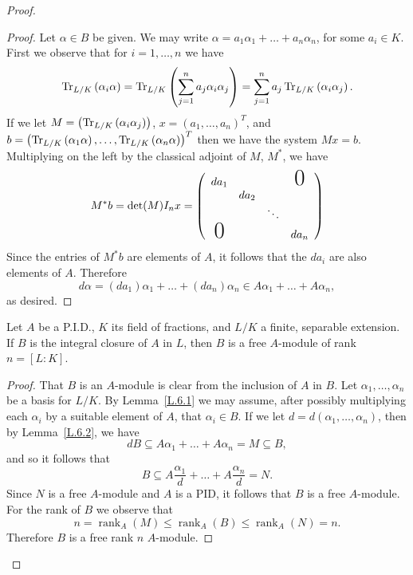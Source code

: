 \documentclass[10pt]{amsart}
\begin{document}
\begin{thm}
\begin{proof}
\begin{lem}
			\begin{proof}
				Let $\alpha \in B$ be given.
				We may write $\alpha = a_1\alpha_1 + \ldots + a_n\alpha_n$, for some $a_i \in K$.
				First we observe that for $i = 1, \ldots, n$ we have
				$$\operatorname{Tr}_{L/K}\left(\alpha_i\alpha\right) = \operatorname{Tr}_{L/K}\left(\sum_{j=1}^n a_j\alpha_i\alpha_j\right) = \sum_{j=1}^na_j\operatorname{Tr}_{L/K}\left(\alpha_i\alpha_j\right).$$
				If we let $M = \left(\operatorname{Tr}_{L/K}\left(\alpha_i\alpha_j\right)\right)$, 
				$x = (a_1, \ldots, a_n)^T$, and 
				$b = \left(\operatorname{Tr}_{L/K}\left(\alpha_1\alpha\right), \ldots, \operatorname{Tr}_{L/K}\left(\alpha_n\alpha\right)\right)^T$ 
				then we have the system $Mx = b$.
				Multiplying on the left by the classical adjoint of $M$, $M^*$, we have
				$$M^*b = \det(M)I_nx = \left(\begin{array}{cccc}
							     	da_1 & & & \text{\huge0}\\
								& da_2 & \\
   								&  & \ddots\\
    								\text{\huge0} & & & da_n
							     \end{array}\right)$$
				Since the entries of $M^*b$ are elements of $A$, it follows that the $da_i$ are also elements of $A$.
				Therefore $$d\alpha = (da_1)\alpha_1 + \ldots + (da_n)\alpha_n \in A\alpha_1 + \ldots + A\alpha_n,$$
				 as desired.
			\end{proof}
		\end{lem}

		\begin{lem}\label{L.6.4}
			Let $A$ be a P.I.D., $K$ its field of fractions, and $L/K$ a finite, separable extension.
			If $B$ is the integral closure of $A$ in $L$, then $B$ is a free $A$-module of rank $n = [L : K]$.
			\begin{proof}
				That $B$ is an $A$-module is clear from the inclusion of $A$ in $B$.
				Let $\alpha_1, \ldots, \alpha_n$ be a basis for $L/K$.
				By Lemma~\ref{L.6.1} we may assume, after possibly multiplying each $\alpha_i$ by a suitable element of $A$, that $\alpha_i \in B$.
				If we let $d = d(\alpha_1, \ldots, \alpha_n)$, then by Lemma~\ref{L.6.2}, we have
				$$dB \subseteq A\alpha_1 + \ldots + A\alpha_n = M \subseteq B,$$
				and so it follows that
				$$B \subseteq A\frac{\alpha_1}{d} + \ldots + A\frac{\alpha_n}{d} = N.$$
				Since $N$ is a free $A$-module and $A$ is a PID, it follows that $B$ is a free $A$-module.
				For the rank of $B$ we observe that
				$$n = \operatorname{rank}_A(M) \leq \operatorname{rank}_A(B) \leq \operatorname{rank}_A(N) = n.$$
				Therefore $B$ is a free rank $n$ $A$-module.
			\end{proof}
		\end{lem}


\end{proof}
\end{thm}
\end{document}
